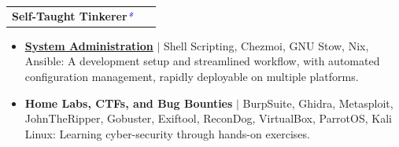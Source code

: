 \documentclass[letterpaper,11pt]{article}
\makeatletter
\newcommand{\uniformunderline}[1]{%
  \uline{\phantom{#1}}%
  \llap{\contour{white}{#1}}%
}
\newcommand{\resumeItem}[1]{
  \item\small{
    {#1 \vspace{-1pt}}
  }
}
\newcommand{\resumeProjectHeading}[2]{
    \item
    \begin{tabular*}{1.001\textwidth}{l@{\extracolsep{\fill}}r}
      \small#1 & \textbf{\small #2}\\
    \end{tabular*}\vspace{-7pt}
}
\newcommand{\resumeItemListStart}{\begin{itemize}}
\newcommand{\resumeItemListEnd}{\end{itemize}\vspace{-5pt}}
\makeatother
\begin{document}

        \resumeProjectHeading
            {\textbf{\large{Self-Taught Tinkerer}}\textcolor{blue}{\small{\textit{*}}}}
            {~}
            \vspace{-11pt}
            \resumeItemListStart 
                \resumeItem{\normalsize{\href{https://github.com/saharshbhansali/.dotfiles}{\textbf{System Administration}} \href{https://github.com/saharshbhansali/.dotfiles}{\footnotesize{\raisebox{-0.1\height}\faExternalLink}} $|$ Shell Scripting, Chezmoi, GNU Stow, Nix, Ansible: A development setup and streamlined workflow, with automated configuration management, rapidly deployable on multiple platforms.}} \vspace{-11pt}
                \resumeItem{\normalsize{\textbf{Home Labs, CTFs, and Bug Bounties} $|$ BurpSuite, Ghidra, Metasploit, JohnTheRipper, Gobuster, Exiftool, ReconDog, VirtualBox, ParrotOS, Kali Linux: Learning cyber-security through hands-on exercises.}} \vspace{-12.5pt}
            \resumeItemListEnd
            \vspace{-15pt}
\end{document}
